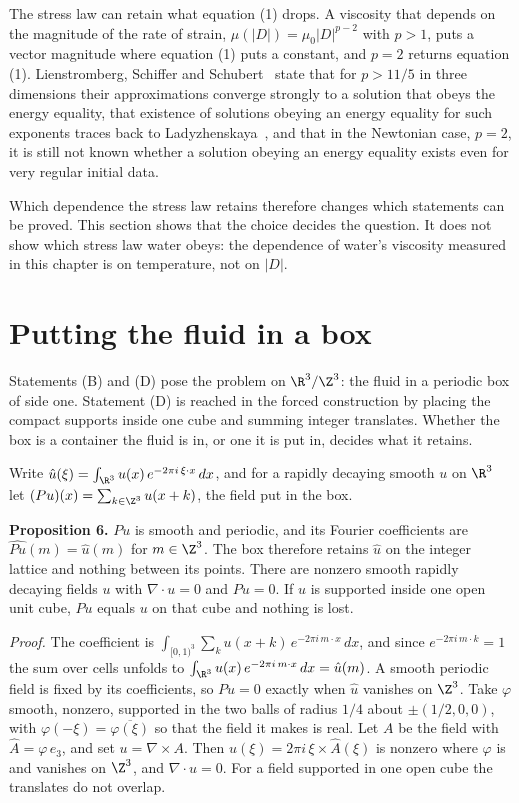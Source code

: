 The stress law can retain what equation (1) drops. A viscosity that depends on the magnitude of the
rate of strain, $\mu(|D|) = \mu_0|D|^{p-2}$ with $p > 1$, puts a vector magnitude where equation (1)
puts a constant, and $p = 2$ returns equation (1). Lienstromberg, Schiffer and Schubert~\cite{src:Lienstromberg-Schiffer-Schubert-2025} state that
for $p > 11/5$ in three dimensions their approximations converge strongly to a solution that obeys
the energy equality, that existence of solutions obeying an energy equality for such exponents
traces back to Ladyzhenskaya~\cite{src:Ladyzhenskaya-1967,src:Ladyzhenskaya-1968,src:Ladyzhenskaya-1969},
and that in the Newtonian case, $p = 2$, it is still not known whether a solution obeying an energy
equality exists even for very regular initial data.

Which dependence the stress law retains therefore changes which statements can be proved. This
section shows that the choice decides the question. It does not show which stress law water obeys:
the dependence of water's viscosity measured in this chapter is on temperature, not on $|D|$.

\section{Putting the fluid in a box}

Statements (B) and (D) pose the problem on $\R^3/\Z^3$: the fluid in a periodic box of side one.
Statement (D) is reached in the forced construction by placing the compact supports inside one
cube and summing integer translates. Whether the box is a container the fluid is in, or one it is
put in, decides what it retains.

Write $\hat u(\xi) = \int_{\R^3} u(x)\,e^{-2\pi i\,\xi\cdot x}\,dx$, and for a rapidly decaying smooth
$u$ on $\R^3$ let $(Pu)(x) = \sum_{k\in\Z^3} u(x+k)$, the field put in the box.

\textbf{Proposition 6.} $Pu$ is smooth and periodic, and its Fourier coefficients are
$\widehat{Pu}(m) = \hat u(m)$ for $m\in\Z^3$. The box therefore retains $\hat u$ on the integer
lattice and nothing between its points. There are nonzero smooth rapidly decaying fields $u$ with
$\nabla\cdot u = 0$ and $Pu = 0$. If $u$ is supported inside one open unit cube, $Pu$ equals $u$
on that cube and nothing is lost.

\emph{Proof.} The coefficient is $\int_{[0,1)^3}\sum_k u(x+k)\,e^{-2\pi i\,m\cdot x}\,dx$, and since
$e^{-2\pi i\,m\cdot k} = 1$ the sum over cells unfolds to $\int_{\R^3} u(x)\,e^{-2\pi i\,m\cdot x}\,dx
= \hat u(m)$. A smooth periodic field is fixed by its coefficients, so $Pu = 0$ exactly when $\hat u$
vanishes on $\Z^3$. Take $\varphi$ smooth, nonzero, supported in the two balls of radius $1/4$
about $\pm(1/2,0,0)$, with $\varphi(-\xi) = \overline{\varphi(\xi)}$ so that the field it makes is
real. Let $A$ be the field with $\hat A = \varphi\,e_3$, and set $u = \nabla\times A$. Then
$\hat u(\xi) = 2\pi i\,\xi\times\hat A(\xi)$ is nonzero where $\varphi$ is and vanishes on $\Z^3$, and
$\nabla\cdot u = 0$. For a field supported in one open cube the translates do not overlap.
\hfill\qedsymbol

